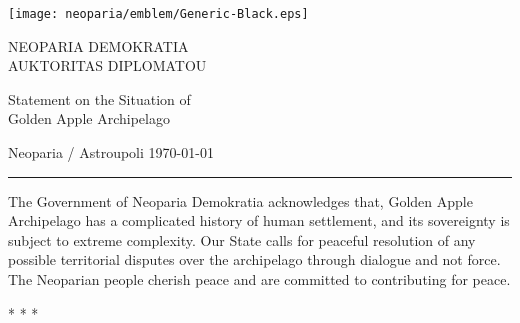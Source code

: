 \documentclass[a4paper,12pt]{article}
\newcommand{\makehead}[4]{
    \begin{minipage}{\linewidth}
        \center
        \sffamily
        \small
        {\hfill{\texttt{[image: neoparia/emblem/Generic-Black.eps]}}\hfill}
        \vspace{6mm}

        \MakeTextUppercase{#1}
        \vspace{11mm}
    \end{minipage}
    \begin{minipage}{\linewidth}
        \center
        \sffamily
        \Large
        #2
        \vspace{12mm}
    \end{minipage}
    {\sffamily\footnotesize #3 \hfill #4}%
    \vspace{2mm}
    \hrule
    \vspace{15mm}
    \rmfamily
}
\newcommand{\makeeof}[0]{
    \vspace{9mm}
    \begin{minipage}{\linewidth}
        \center
        * * *
    \end{minipage}
}
\begin{document}
\pagestyle{empty}
\makehead{Neoparia Demokratia\\Auktoritas Diplomatou}{Statement on the Situation of\\ Golden Apple Archipelago}{Neoparia / Astroupoli}{\today}

The Government of Neoparia Demokratia acknowledges that, Golden Apple Archipelago has a complicated history of human settlement, and its sovereignty is subject to extreme complexity. Our State calls for peaceful resolution of any possible territorial disputes over the archipelago through dialogue and not force. The Neoparian people cherish peace and are committed to contributing for peace.

\makeeof
\end{document}
